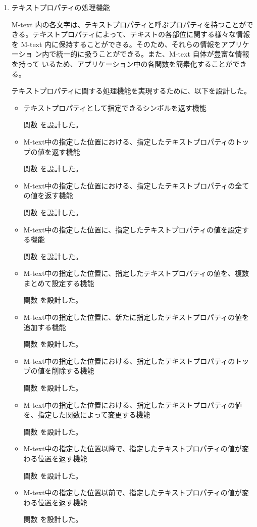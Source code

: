 \begin{enumerate}
\item テキストプロパティの処理機能

M-text 内の各文字は、テキストプロパティと呼ぶプロパティを持つことがで
きる。テキストプロパティによって、テキストの各部位に関する様々な情報を
M-text 内に保持することができる。そのため、それらの情報をアプリケーショ
ン内で統一的に扱うことができる。また、M-text 自体が豊富な情報を持って
いるため、アプリケーション中の各関数を簡素化することができる。

テキストプロパティに関する処理機能を実現するために、以下を設計した。 

     \begin{itemize}
     \item テキストプロパティとして指定できるシンボルを返す機能\par 
       関数 を設計した。
      \item M-text中の指定した位置における、指定したテキストプロパティのトップの値を返す機能\par 
	関数 を設計した。
      \item M-text中の指定した位置における、指定したテキストプロパティの全ての値を返す機能\par 
	関数 を設計した。
      \item M-text中の指定した位置に、指定したテキストプロパティの値を設定する機能\par 
	関数 を設計した。
      \item M-text中の指定した位置に、指定したテキストプロパティの値を、複数まとめて設定する機能\par 
	関数 を設計した。
      \item M-text中の指定した位置に、新たに指定したテキストプロパティの値を追加する機能\par 
	関数 を設計した。
      \item M-text中の指定した位置における、指定したテキストプロパティのトップの値を削除する機能\par 
	関数 を設計した。
      \item M-text中の指定した位置における、指定したテキストプロパティの値を、指定した関数によって変更する機能\par 
	関数 を設計した。
      \item M-text中の指定した位置以降で、指定したテキストプロパティの値が変わる位置を返す機能\par 
	関数 を設計した。
      \item M-text中の指定した位置以前で、指定したテキストプロパティの値が変わる位置を返す機能\par 
	関数 を設計した。
     \end{itemize}
     

\end{enumerate}
